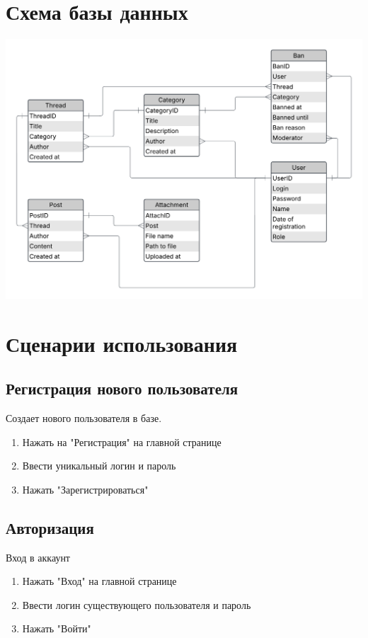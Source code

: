 \documentclass[a4paper, 12pt]{article}
\begin{document}
\section{Схема базы данных}
	\includegraphics[width=\textwidth]{ERD}
	
\section{Сценарии использования}
	\subsection{Регистрация нового пользователя}
		Создает нового пользователя в базе.
		\begin{enumerate}
			\item Нажать на "Регистрация" на главной странице
			\item Ввести уникальный логин и пароль
			\item Нажать "Зарегистрироваться"
		\end{enumerate}
		
	\subsection{Авторизация}
		Вход в аккаунт
		\begin{enumerate}
			\item Нажать "Вход" на главной странице
			\item Ввести логин существующего пользователя и пароль
			\item Нажать "Войти"
		\end{enumerate}
		
\end{document}
